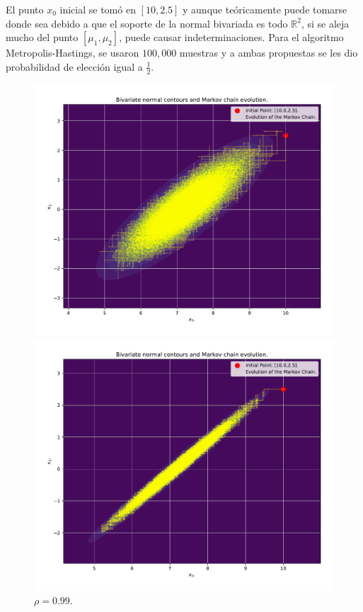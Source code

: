 El punto $x_0$ inicial se tomó en $[10,2.5]$ y aunque teóricamente puede tomarse donde sea debido a que el soporte de la normal bivariada es todo $\mathbb{R}^2$, si se aleja mucho del punto $[\mu_1,\mu_2]$, puede causar indeterminaciones. Para el algoritmo Metropolis-Hastings, se usaron $100,000$ muestras y a ambas propuestas se les dio probabilidad de elección igual a $\frac{1}{2}$.

\begin{figure}[h] \label{fig:1}
	\centering
	\begin{minipage}{0.495\textwidth}
		\centering
		\includegraphics[width=\textwidth]{IMAGENES/p085.pdf}
		\caption{$\rho = 0.85$.}
	\end{minipage}
	\hfill
	\begin{minipage}{0.495\textwidth}
		\centering
		\includegraphics[width=\textwidth]{IMAGENES/p099.pdf}
		\caption{$\rho = 0.99$.}
	\end{minipage}
\end{figure}

